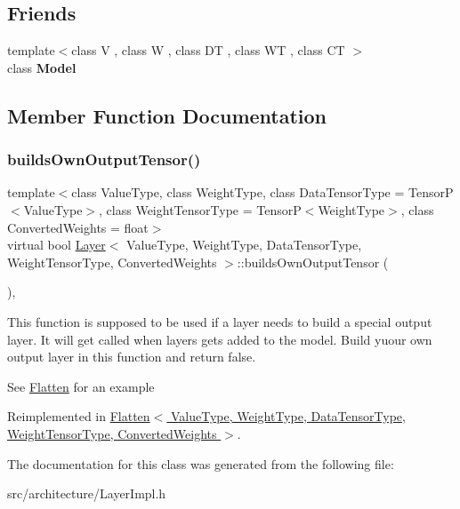 \subsection*{Friends}
\begin{DoxyCompactItemize}
\item 
\mbox{\label{classLayer_ae5f92f969812a07238aa2694e0e74be4}} 
{\footnotesize template$<$class V , class W , class DT , class WT , class CT $>$ }\\class {\bfseries Model}
\end{DoxyCompactItemize}


\subsection{Member Function Documentation}
\mbox{\label{classLayer_a9a126cb372c0bd529c65a06077d8b429}} 
\subsubsection{\texorpdfstring{builds\+Own\+Output\+Tensor()}{buildsOwnOutputTensor()}}
{\footnotesize\ttfamily template$<$class Value\+Type, class Weight\+Type, class Data\+Tensor\+Type = Tensor\+P$<$\+Value\+Type$>$, class Weight\+Tensor\+Type = Tensor\+P$<$\+Weight\+Type$>$, class Converted\+Weights = float$>$ \\
virtual bool \hyperlink{classLayer}{Layer}$<$ Value\+Type, Weight\+Type, Data\+Tensor\+Type, Weight\+Tensor\+Type, Converted\+Weights $>$\+::builds\+Own\+Output\+Tensor (\begin{DoxyParamCaption}{ }\end{DoxyParamCaption})\hspace{0.3cm}{\ttfamily [inline]}, {\ttfamily [virtual]}}



This function is supposed to be used if a layer needs to build a special output layer. It will get called when layers gets added to the model. Build yuour own output layer in this function and return false. 

See \hyperlink{classFlatten}{Flatten} for an example 

Reimplemented in \hyperlink{classFlatten_a53379945e182152effef9456b32eb65a}{Flatten$<$ Value\+Type, Weight\+Type, Data\+Tensor\+Type, Weight\+Tensor\+Type, Converted\+Weights $>$}.



The documentation for this class was generated from the following file\+:\begin{DoxyCompactItemize}
\item 
src/architecture/Layer\+Impl.\+h\end{DoxyCompactItemize}

